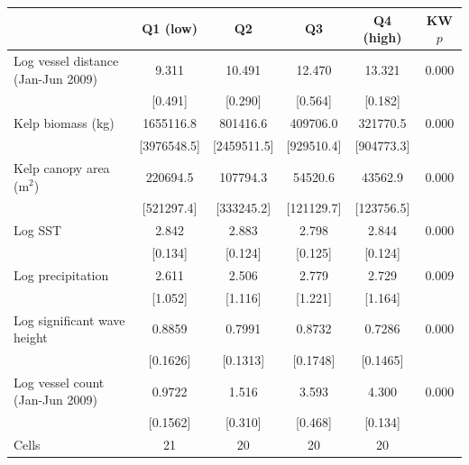 \def\sym#1{\ifmmode^{#1}\else\(^{#1}\)\fi}
\begin{tabular}{l*{4}{c}c}
\hline\hline
                    &\multicolumn{1}{c}{Q1 (low)}&\multicolumn{1}{c}{Q2}&\multicolumn{1}{c}{Q3}&\multicolumn{1}{c}{Q4 (high)}&\multicolumn{1}{c}{KW $p$}\\
\hline
Log vessel distance (Jan-Jun 2009)      &       9.311&      10.491&      12.470&      13.321&   0.000\\
                                        &     [0.491]&     [0.290]&     [0.564]&     [0.182]&        \\
[0.5em]
Kelp biomass (kg)                       &   1655116.8&    801416.6&    409706.0&    321770.5&   0.000\\
                                        & [3976548.5]& [2459511.5]&  [929510.4]&  [904773.3]&        \\
[0.3em]
Kelp canopy area (m$^{2}$)              &    220694.5&    107794.3&     54520.6&     43562.9&   0.000\\
                                        &  [521297.4]&  [333245.2]&  [121129.7]&  [123756.5]&        \\
[0.3em]
Log SST                                 &       2.842&       2.883&       2.798&       2.844&   0.000\\
                                        &     [0.134]&     [0.124]&     [0.125]&     [0.124]&        \\
[0.3em]
Log precipitation                       &       2.611&       2.506&       2.779&       2.729&   0.009\\
                                        &     [1.052]&     [1.116]&     [1.221]&     [1.164]&        \\
[0.3em]
Log significant wave height             &      0.8859&      0.7991&      0.8732&      0.7286&   0.000\\
                                        &    [0.1626]&    [0.1313]&    [0.1748]&    [0.1465]&        \\
[0.3em]
Log vessel count (Jan-Jun 2009)         &      0.9722&       1.516&       3.593&       4.300&   0.000\\
                                        &    [0.1562]&     [0.310]&     [0.468]&     [0.134]&        \\
[0.3em]
\hline
Cells                                   &          21&          20&          20&          20&        \\
\hline\hline
\end{tabular}